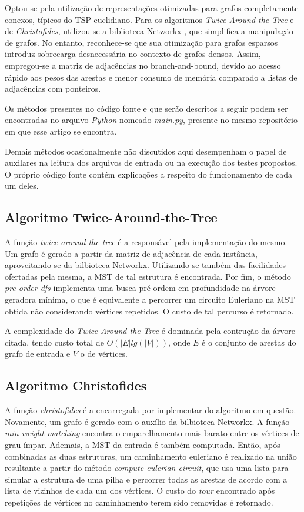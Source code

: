 \documentclass[12pt]{article}
\begin{document}
Optou-se pela utilização de representações otimizadas para grafos completamente conexos, típicos do TSP euclidiano. Para os algoritmos \textit{Twice-Around-the-Tree} e de \textit{Christofides}, utilizou-se a biblioteca Networkx \cite{networkx}, que simplifica a manipulação de grafos. No entanto, reconhece-se que sua otimização para grafos esparsos introduz sobrecarga desnecessária no contexto de grafos densos. Assim, empregou-se a matriz de adjacências no branch-and-bound, devido ao acesso rápido aos pesos das arestas e menor consumo de memória comparado a listas de adjacências com ponteiros.

Os métodos presentes no código fonte e que serão descritos a seguir podem ser encontradas no arquivo \textit{Python} nomeado \textit{main.py}, presente no mesmo repositório em que esse artigo se encontra. 

Demais métodos ocasionalmente não discutidos aqui desempenham o papel de auxilares na leitura dos arquivos de entrada ou na execução dos testes propostos. O próprio código fonte contém explicações a respeito do funcionamento de cada um deles. 

\subsection{Algoritmo Twice-Around-the-Tree}

A função \textit{twice-around-the-tree} é a responsável pela implementação do mesmo. Um grafo é gerado a partir da matriz de adjacência de cada instância, aproveitando-se da bilbioteca Networkx. Utilizando-se também das facilidades ofertadas pela mesma, a MST de tal estrutura é encontrada. Por fim, o método \textit{pre-order-dfs} implementa uma busca pré-ordem em profundidade na árvore geradora mínima, o que é equivalente a percorrer um circuito Euleriano na MST obtida não considerando vértices repetidos. O custo de tal percurso é retornado.

A complexidade do \textit{Twice-Around-the-Tree} é dominada pela contrução da árvore citada, tendo custo total de $O(|E| lg(|V|))$, onde $E$ é o conjunto de arestas do grafo de entrada e $V$ o de vértices.

\subsection{Algoritmo Christofides}

A função \textit{christofides} é a encarregada por implementar do algoritmo em questão. Novamente, um grafo é gerado com o auxílio da bilbioteca Networkx. A função \textit{min-weight-matching} encontra o emparelhamento mais barato entre os vértices de grau ímpar. Ademais, a MST da entrada é também computada. Então, após combinadas as duas estruturas, 
um caminhamento euleriano é realizado na união resultante a partir do método \textit{compute-eulerian-circuit}, que usa uma lista para simular a estrutura de uma pilha e percorrer todas as arestas de acordo com a lista de vizinhos de cada um dos vértices. O custo do \textit{tour} encontrado após repetições de vértices no caminhamento terem sido removidas é retornado.   
\end{document}
